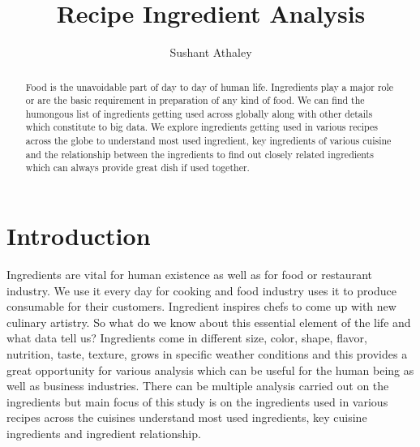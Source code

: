 \documentclass[sigconf]{acmart}
\begin{document}
\title{Recipe Ingredient Analysis}


\author{Sushant Athaley}

\renewcommand{\shortauthors}{G. v. Laszewski}


\begin{abstract}
Food is the unavoidable part of day to day of human life. Ingredients play a major role or are the basic requirement in preparation of any kind of food. We can find the humongous list of ingredients getting used across globally along with other details which constitute to big data. We explore ingredients getting used in various recipes across the globe to understand most used ingredient, key ingredients of various cuisine and the relationship between the ingredients to find out closely related ingredients which can always provide great dish if used together.
\end{abstract}


\maketitle

\section{Introduction}
Ingredients are vital for human existence as well as for food or restaurant industry. We use it every day for cooking and food industry uses it to produce consumable for their customers. Ingredient inspires chefs to come up with new culinary artistry. So what do we know about this essential element of the life and what data tell us? Ingredients come in different size, color, shape, flavor, nutrition, taste, texture, grows in specific weather conditions and this provides a great opportunity for various analysis which can be useful for the human being as well as business industries. There can be multiple analysis carried out on the ingredients but main focus of this study is on the ingredients used in various recipes across the cuisines understand most used ingredients, key cuisine ingredients and ingredient relationship.
\end{document}
